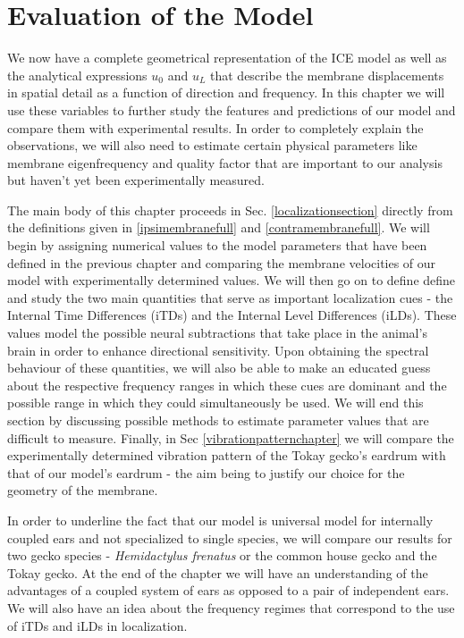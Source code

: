 \chapter{Evaluation of the Model}\label{modelanalysis}
We now have a complete geometrical representation of the ICE model as well as
 the analytical expressions $u_0$ and $u_L$ that describe the membrane displacements
in spatial detail as a function of direction and frequency. In this chapter we will use these variables
to further study the features and predictions of our model and compare them with experimental results. In
order to completely explain the observations, we will also need to estimate certain physical parameters
like membrane eigenfrequency and quality factor that are important to our analysis but haven't yet been
experimentally measured.

The main body of this chapter proceeds in Sec. \ref{localizationsection} directly from the definitions given in \eqref{ipsimembranefull}
and \eqref{contramembranefull}. We will begin by assigning numerical values to the model parameters that have been defined
in the previous chapter and comparing the membrane velocities of our model with experimentally determined values. 
We will then go on to define define and study the two main quantities that serve as important localization
cues - the Internal Time Differences (iTDs) and the Internal Level Differences (iLDs). 
These values model the 
possible neural subtractions that take place in the animal's brain in order to enhance directional sensitivity. Upon obtaining 
the spectral behaviour of these quantities, we will also be able to make an educated guess about
the respective frequency ranges in which these cues are dominant and the possible range in which they could simultaneously
be used. 
We will end this section
by discussing possible methods to estimate parameter values that are difficult to measure.
Finally, in Sec \ref{vibrationpatternchapter} we will compare the experimentally determined vibration pattern
of the Tokay gecko's eardrum with that of our model's eardrum - the aim being to justify our choice for the
geometry of the membrane.

In order to underline the fact that our model is universal model for internally coupled ears and not
specialized to single species, we will compare our results for two gecko species - \emph{Hemidactylus frenatus}
or the common house gecko and the Tokay gecko. At the end of the chapter we will have an understanding of the advantages of a coupled system of ears as opposed
to a pair of independent ears. We will also have an idea about the frequency regimes that correspond to the use
of iTDs and iLDs in localization.

